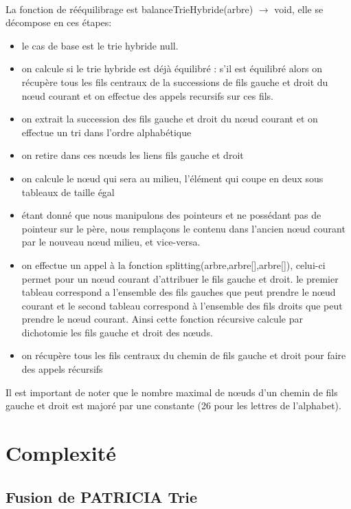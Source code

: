 \documentclass[a4paper,12pt]{report}
\begin{document}
\paragraph{}
La fonction de rééquilibrage est balanceTrieHybride(arbre) $\rightarrow$ void, elle se décompose en ces étapes:
\begin{itemize}
 \item le cas de base est le trie hybride null.
 \item on calcule si le trie hybride est déjà équilibré : s'il est équilibré alors on récupère tous les fils centraux de la
 successions de fils gauche et droit du nœud courant et on effectue des appels recursifs sur ces fils.
 \item on extrait la succession des fils gauche et droit du nœud courant et on effectue un tri dans l'ordre alphabétique
 \item on retire dans ces nœuds les liens fils gauche et droit
 \item on calcule le nœud qui sera au milieu, l'élément qui coupe en deux sous tableaux de taille égal
 \item étant donné que nous manipulons des pointeurs et ne possédant pas de pointeur sur le père, nous remplaçons le contenu
 dans l'ancien nœud courant par le nouveau nœud milieu, et vice-versa.
 \item on effectue un appel à la fonction splitting(arbre,arbre[],arbre[]), celui-ci permet pour un nœud courant d'attribuer le
 fils gauche et droit. le premier tableau correspond a l'ensemble des fils gauches que peut prendre le nœud courant et le second
 tableau correspond à l'ensemble des fils droits que peut prendre le nœud courant. Ainsi cette fonction récursive calcule par
 dichotomie les fils gauche et droit des nœuds.
 \item on récupère tous les fils centraux du chemin de fils gauche et droit pour faire des appels récursifs
\end{itemize}
Il est important de noter que le nombre maximal de nœuds d'un chemin de fils gauche et droit est majoré par une constante (26
pour les lettres de l'alphabet).

\section{Complexité}
\subsection{Fusion de PATRICIA Trie}
\end{document}
